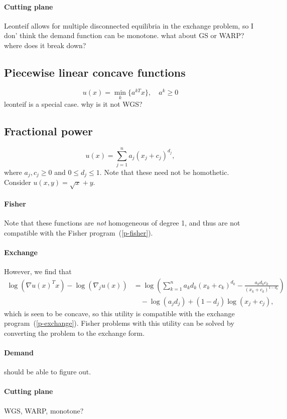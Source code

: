 \documentclass[12pt]{article}
\begin{document}
\paragraph{Cutting plane}
Leonteif allows for multiple disconnected equilibria in the exchange problem,
so I don' think the demand function can be monotone. what about
GS or WARP? where does it break down?

\subsection{Piecewise linear concave functions}
\[
u(x) = \min_k\lbrace a^{kT}x \rbrace,\quad a^k \geq 0
\]
leonteif is a special case. why is it not WGS?

\subsection{Fractional power}
\[
u(x) = \sum_{j=1}^n a_j (x_j+ c_j)^{d_j},
\]
where $a_j, c_j \geq 0$ and $0 \leq d_j \leq 1$.
Note that these need not be homothetic. Consider $u(x,y) = \sqrt{x} + y$.

\paragraph{Fisher}
Note that these functions are \emph{not} homogeneous of degree 1, and thus
are not compatible with the Fisher program~(\ref{p-fisher}).

\paragraph{Exchange}
However, we find that 
\begin{align*}
\log(\nabla u(x)^T x) - \log(\nabla_j u(x))
&= \log\left(\sum_{k=1}^n a_k d_k (x_k+c_k)^{d_k} - \frac{a_k d_k c_k}{(x_k + c_k)^{1-d_k}} \right)\\
&\quad- \log(a_j d_j) + (1-d_j)\log (x_j + c_j),
\end{align*}
which is seen to be concave, so this utility is compatible with
the exchange program~(\ref{p-exchange}).
Fisher problems with this utility can be solved by converting the
problem to the exchange form.

\paragraph{Demand}
should be able to figure out.

\paragraph{Cutting plane}
WGS, WARP, monotone?
\end{document}
